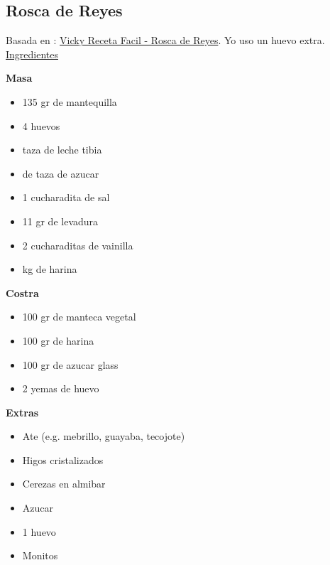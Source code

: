 \subsection{Rosca de Reyes}

Basada en : \href{https://www.youtube.com/watch?v=4IgNDiX7cHg}{Vicky Receta Facil - Rosca de Reyes}. Yo uso un huevo extra.\\

\underline{Ingredientes}

\textbf{Masa}
\begin{itemize}
\item 135 gr de mantequilla
\item 4 huevos
\item {} taza de leche tibia
\item {} de taza de azucar
\item 1 cucharadita de sal
\item 11 gr de levadura
\item 2 cucharaditas de vainilla
\item {} kg de harina
\end{itemize}

\textbf{Costra}
\begin{itemize}
\item 100 gr de manteca vegetal
\item 100 gr de harina
\item 100 gr de azucar glass
\item 2 yemas de huevo
\end{itemize}

\textbf{Extras}
\begin{itemize}
\item Ate (e.g. mebrillo, guayaba, tecojote)
\item Higos cristalizados
\item Cerezas en almibar
\item Azucar
\item 1 huevo
\item Monitos
\end{itemize}

